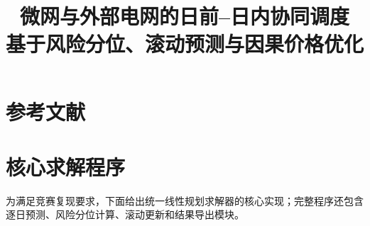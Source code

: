 \documentclass[12pt,a4paper]{ctexart}
\title{\textbf{微网与外部电网的日前--日内协同调度\\\large 基于风险分位、滚动预测与因果价格优化}}
\author{}
\date{}
\begin{document}
\maketitle
\thispagestyle{fancy}

\newpage
\tableofcontents
\newpage








\section*{参考文献}

\appendix

\section{核心求解程序}
为满足竞赛复现要求，下面给出统一线性规划求解器的核心实现；完整程序还包含逐日预测、风险分位计算、滚动更新和结果导出模块。

\end{document}
